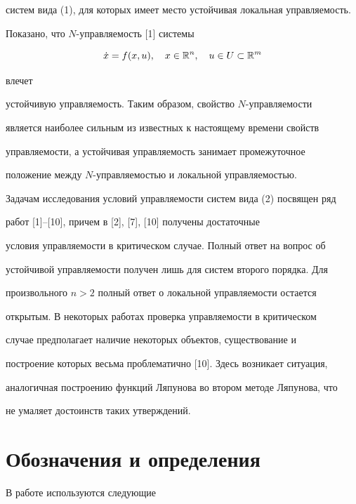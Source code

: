 систем вида (1), для которых имеет место устойчивая локальная управляемость.


Показано, что $N$-управляемость [1] системы


\begin{equation}


\Dot x = f(x,u),\quad x\in\R^n,\quad u\in U\subset\R^m


\end{equation}


влечет


устойчивую управляемость. Таким образом, свойство $N$-управляемости


является наиболее сильным из известных к настоящему времени свойств


управляемости, а устойчивая управляемость занимает промежуточное


положение между $N$-управляемостью и локальной управляемостью.





Задачам исследования условий управляемости систем вида (2) посвящен ряд


работ [1]--[10], причем в [2], [7], [10] получены достаточные


условия управляемости в критическом случае. Полный ответ на вопрос об


устойчивой управляемости получен лишь для систем второго порядка. Для


произвольного $n>2$ полный ответ о локальной управляемости остается


открытым. В некоторых работах проверка управляемости в критическом


случае предполагает наличие некоторых объектов, существование и


построение которых весьма проблематично [10]. Здесь возникает ситуация,


аналогичная построению функций Ляпунова во втором методе Ляпунова, что


не умаляет достоинств таких утверждений.





\section{Обозначения и определения}





В работе используются следующие


